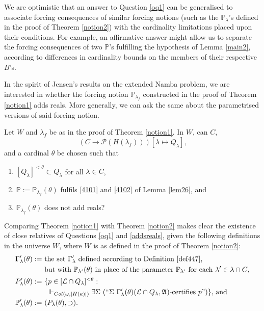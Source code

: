 \documentclass[12pt]{article}
\numberwithin{equation}{section}
\begin{document}
We are optimistic that an answer to Question \ref{oq1} can be generalised to associate forcing consequences of similar forcing notions (such as the $\mathbb{P}_{\lambda}$'s defined in the proof of Theorem \ref{notion2}) with the cardinality limitations placed upon their conditions. For example, an affirmative answer might allow us to separate the forcing consequences of two $\mathbb{P}$'s fulfilling the hypothesis of Lemma \ref{main2}, according to differences in cardinality bounds on the members of their respective $B$'s.

In the spirit of Jensen's results on the extended Namba problem, we are interested in whether the forcing notion $\mathbb{P}_{\lambda_f}$ constructed in the proof of Theorem \ref{notion1} adds reals. More generally, we can ask the same about the parametrised versions of said forcing notion. 

\begin{ques}\label{addsreals}
Let $W$ and $\lambda_f$ be as in the proof of Theorem \ref{notion1}. In $W$, can $C$, $$(C \longrightarrow \mathcal{P}(H(\lambda_f))) [\lambda \mapsto Q_{\lambda}] \text{,}$$ and a cardinal $\theta$ be chosen such that
\begin{enumerate}[label=(\arabic*)]
    \item $[Q_{\lambda}]^{< \theta} \subset Q_{\lambda}$ for all $\lambda \in C$,
    \item $\mathbb{P} := \mathbb{P}_{\lambda_f}(\theta)$ fulfils \ref{4101} and \ref{4102} of Lemma \ref{lem26}, and
    \item $\mathbb{P}_{\lambda_f}(\theta)$ does not add reals?
\end{enumerate}
\end{ques}

Comparing Theorem \ref{notion1} with Theorem \ref{notion2} makes clear the existence of close relatives of Questions \ref{oq1} and \ref{addsreals}, given the following definitions in the universe $W$, where $W$ is as defined in the proof of Theorem \ref{notion2}:
\begin{align*}
    \Gamma'_{\lambda}(\theta) := \ & \text{the set } \Gamma'_{\lambda} \text{ defined according to Definition \ref{def447},} \\
    & \text{but with } \mathbb{P}_{\lambda'}(\theta) \text{ in place of the parameter } \mathbb{P}_{\lambda'} \text{ for each } \lambda' \in \lambda \cap C \text{,} \\
    P'_{\lambda}(\theta) := \ & \{p \in [\mathcal{L} \cap Q_{\lambda}]^{< \theta} : \\
    & \ \Vdash_{Col(\omega, |H(\kappa)|)} \exists \Sigma \ (``\Sigma \ \Gamma'_{\lambda}(\theta) (\mathcal{L} \cap Q_{\lambda}, \mathfrak{A}) \text{-certifies } p")\} \text{, and} \\
    \mathbb{P}'_{\lambda}(\theta) := \ & (P_{\lambda}(\theta), \supset) \text{.}
\end{align*}
\end{document}
